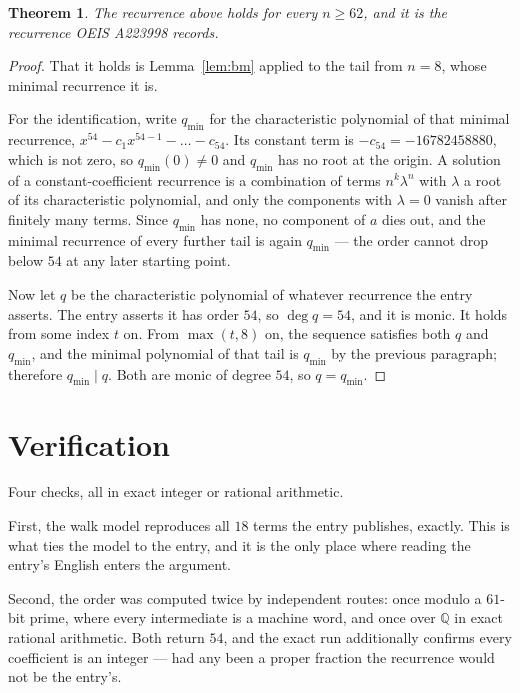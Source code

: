\documentclass[11pt,a4paper]{article}
\theoremstyle{plain}
\newtheorem{theorem}{Theorem}
\theoremstyle{definition}
\begin{document}
\begin{theorem}
The recurrence above holds for every $n\ge62$, and it is the recurrence OEIS A223998 records.
\end{theorem}

\begin{proof}
That it holds is Lemma~\ref{lem:bm} applied to the tail from $n=8$, whose minimal
recurrence it is.

For the identification, write $q_{\min}$ for the characteristic polynomial of that minimal
recurrence, $x^{54}-c_1x^{54-1}-\dots-c_{54}$. Its constant term is
$-c_{54}=-16782458880$, which is not zero, so $q_{\min}(0)\neq0$ and $q_{\min}$ has no
root at the origin. A solution of a constant-coefficient recurrence is a combination of terms
$n^{k}\lambda^{n}$ with $\lambda$ a root of its characteristic polynomial, and only the
components with $\lambda=0$ vanish after finitely many terms. Since $q_{\min}$ has none, no
component of $a$ dies out, and the minimal recurrence of every further tail is again
$q_{\min}$ --- the order cannot drop below $54$ at any later starting point.

Now let $q$ be the characteristic polynomial of whatever recurrence the entry asserts. The
entry asserts it has order $54$, so $\deg q=54$, and it is monic. It holds from some
index $t$ on. From $\max(t,8)$ on, the sequence satisfies both $q$ and $q_{\min}$, and
the minimal polynomial of that tail is $q_{\min}$ by the previous paragraph; therefore
$q_{\min}\mid q$. Both are monic of degree $54$, so $q=q_{\min}$.
\end{proof}

\section{Verification}

Four checks, all in exact integer or rational arithmetic.

First, the walk model reproduces all $18$ terms the entry publishes, exactly. This is
what ties the model to the entry, and it is the only place where reading the entry's English
enters the argument.

Second, the order was computed twice by independent routes: once modulo a $61$-bit prime, where
every intermediate is a machine word, and once over $\mathbb{Q}$ in exact rational arithmetic.
Both return $54$, and the exact run additionally confirms every coefficient is an integer
--- had any been a proper fraction the recurrence would not be the entry's.
\end{document}
